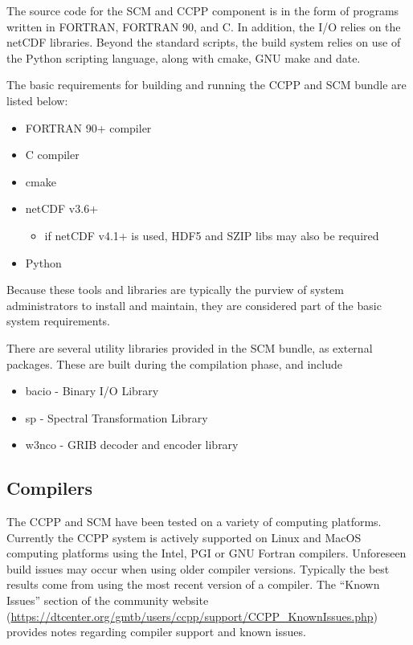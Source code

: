 The source code for the SCM and CCPP component is in the form of programs written in FORTRAN, FORTRAN 90, and C. In addition, the I/O relies on the netCDF libraries. Beyond the standard scripts, the build system relies on use of the Python scripting language, along with cmake, GNU make and date.

The basic requirements for building and running the CCPP and SCM bundle are listed below:
\begin{itemize}
    \item FORTRAN 90+ compiler
    \item C compiler
    \item cmake 
    \item netCDF v3.6+
        \begin{itemize}
    \item if netCDF v4.1+ is used, HDF5 and SZIP libs may also be required
\end{itemize}
    \item Python
\end{itemize}

Because these tools and libraries are typically the purview of system administrators to install and maintain, they are considered  part of the basic system requirements.

There are several utility libraries provided in the SCM bundle, as external packages. These are built during the compilation phase, and include
\begin{itemize}
    \item bacio - Binary I/O Library
    \item sp - Spectral Transformation Library
    \item w3nco - GRIB decoder and encoder library
\end{itemize}

\subsection{Compilers}
The CCPP and SCM have been tested on a variety of
computing platforms. Currently the CCPP system is actively supported
on Linux and MacOS computing platforms using the Intel, PGI or GNU Fortran
compilers. Unforeseen build issues may occur when using older
compiler versions. Typically the best results come from using the
most recent version of a compiler. The ``Known Issues'' section of the
community website (\url{https://dtcenter.org/gmtb/users/ccpp/support/CCPP_KnownIssues.php}) provides notes regarding compiler support and known issues.

